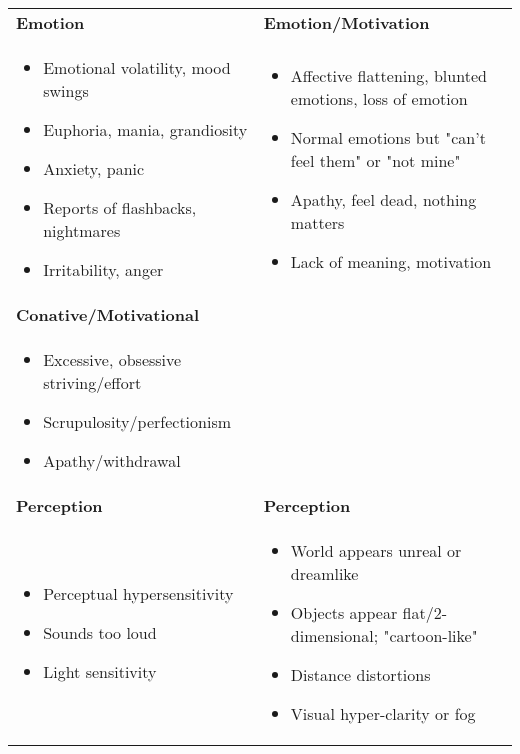 \documentclass[12pt,letterpaper]{book}
\newenvironment{compactitemize}
{\begin{itemize}[nosep, leftmargin=1em, itemsep=0pt, topsep=0pt]}
{\end{itemize}}
\begin{document}
\begin{longtable}{p{}|p{}}
\textbf{Emotion} & \textbf{Emotion/Motivation} \\*
\begin{compactitemize}
\item Emotional volatility, mood swings
\item Euphoria, mania, grandiosity
\item Anxiety, panic
\item Reports of flashbacks, nightmares
\item Irritability, anger
\end{compactitemize}
&
\begin{compactitemize}
\item Affective flattening, blunted emotions, loss of emotion
\item Normal emotions but "can't feel them" or "not mine"
\item Apathy, feel dead, nothing matters
\item Lack of meaning, motivation
\end{compactitemize} \\[1ex]

\textbf{Conative/Motivational} & \\*
\begin{compactitemize}
\item Excessive, obsessive striving/effort
\item Scrupulosity/perfectionism
\item Apathy/withdrawal
\end{compactitemize}
& \\[1ex]

\textbf{Perception} & \textbf{Perception} \\*
\begin{compactitemize}
\item Perceptual hypersensitivity
\item Sounds too loud
\item Light sensitivity
\end{compactitemize}
&
\begin{compactitemize}
\item World appears unreal or dreamlike
\item Objects appear flat/2-dimensional; "cartoon-like"
\item Distance distortions
\item Visual hyper-clarity or fog
\end{compactitemize} \\[1ex]


\end{longtable}
\end{document}
